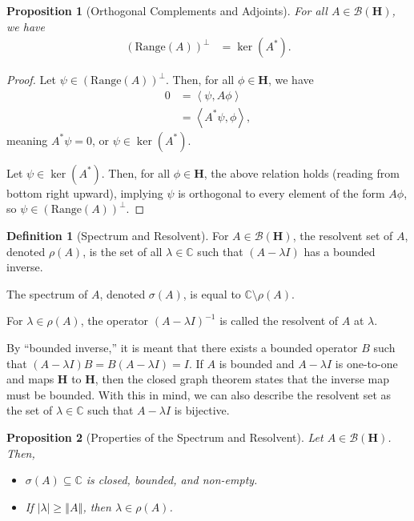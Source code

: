 \documentclass[12pt]{extarticle}
\newcommand{\C}{\mathbb{C}}
\newcommand{\iprod}[2]{\left\langle #1,#2\right\rangle}
\newcommand{\norm}[1]{\left\Vert #1\right\Vert}
\theoremstyle{plain}
\newtheorem*{proposition}{Proposition}%
\theoremstyle{definition}
\newtheorem*{definition}{Definition}
\theoremstyle{remark}
\renewcommand{\newline}{\hfill\break}
\begin{document}
  \begin{proposition}[Orthogonal Complements and Adjoints]
  For all $A\in \mathcal{B}(\mathbf{H})$, we have
  \begin{align*}
    \left(\text{Range}(A)\right)^{\perp} &= \ker(A^{\ast}).
  \end{align*}
  \end{proposition}
  \begin{proof}
    Let $\psi \in \left(\text{Range}(A)\right)^{\perp}$. Then, for all $\phi \in \mathbf{H}$, we have
    \begin{align*}
      0 &= \iprod{\psi}{A\phi}\\
        &= \iprod{A^{\ast}\psi}{\phi},
    \end{align*}
    meaning $A^{\ast}\psi = 0$, or $\psi \in \ker(A^{\ast})$.\newline

    Let $\psi \in \ker(A^{\ast})$. Then, for all $\phi \in \mathbf{H}$, the above relation holds (reading from bottom right upward), implying $\psi$ is orthogonal to every element of the form $A\phi$, so $\psi \in \left(\text{Range}(A)\right)^{\perp}$.
  \end{proof}
  \begin{definition}[Spectrum and Resolvent]
    For $A\in \mathcal{B}(\mathbf{H})$, the resolvent set of $A$, denoted $\rho(A)$, is the set of all $\lambda \in \C$ such that $(A-\lambda I)$ has a bounded inverse.\newline

    The spectrum of $A$, denoted $\sigma(A)$, is equal to $\C\setminus \rho(A)$.\newline

    For $\lambda \in \rho(A)$, the operator $(A - \lambda I)^{-1}$ is called the resolvent of $A$ at $\lambda$.
  \end{definition}
  By ``bounded inverse,'' it is meant that there exists a bounded operator $B$ such that $\left(A - \lambda I\right) B = B \left(A - \lambda I\right) = I$. If $A$ is bounded and $A - \lambda I$ is one-to-one and maps $\mathbf{H}$ to $\mathbf{H}$, then the closed graph theorem states that the inverse map must be bounded. With this in mind, we can also describe the resolvent set as the set of $\lambda \in \C$ such that $A - \lambda I$ is bijective.
  \begin{proposition}[Properties of the Spectrum and Resolvent]
    Let $A\in \mathcal{B}\left(\mathbf{H}\right)$. Then,
    \begin{itemize}
      \item $\sigma(A)\subseteq \C$ is closed, bounded, and non-empty.
      \item If $|\lambda| \geq \norm{A}$, then $\lambda \in \rho(A)$.
    \end{itemize}
  \end{proposition}
\end{document}
